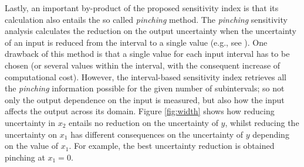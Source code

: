 \documentclass[twocolumn]{rps-esrel2022}
\begin{document}
Lastly, an important by-product of the proposed sensitivity index is that its calculation also entails the so called \textit{pinching} method.
The \textit{pinching} sensitivity analysis calculates the reduction on the output uncertainty when the uncertainty of an input is reduced from the interval to a single value (e.g., see \cite{ferson2006sensitivity,PatelliUQ, gray2022inference}).
One drawback of this method is that a single value for each input interval has to be chosen (or several values within the interval, with the consequent
increase of computational cost).
However, the interval-based sensitivity index retrieves all the \textit{pinching} information possible for the given number of subintervals; so not only the
output dependence on the input is measured, but also how the input affects the output across its domain.
Figure \ref{fig:width} shows how reducing uncertainty in $x_2$ entails no reduction on the uncertainty of $y$, whilst reducing the uncertainty on $x_1$ has different consequences on the
uncertainty of $y$ depending on the value of $x_1$.
For example, the best uncertainty reduction is obtained pinching at $x_1 = 0$.
\end{document}
